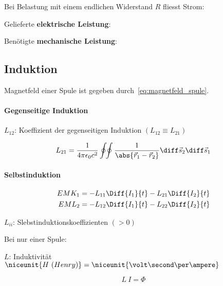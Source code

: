 		Bei Belastung mit einem endlichen Widerstand $R$ fliesst Strom:
		
		Gelieferte \textbf{elektrische Leistung}:
		
		Benötigte \textbf{mechanische Leistung}:
	\subsection{Induktion} %
		Magnetfeld einer Spule ist gegeben durch~\eqref{eq:magnetfeld_spule}.
		
		\paragraph{Gegenseitige Induktion} %
			\begin{tightitemize}
				\item[$L_{12}$:] Koeffizient der gegenseitigen Induktion $(L_{12} \equiv L_{21})$
			\end{tightitemize}
			\begin{equation*}
				L_{21} = \frac{1}{4\pi\epsilon_0 c^2} \oint\!\!\oint \frac{1}{\abs{\vec r_1 - \vec r_2}} \diff \vec s_2 \diff \vec s_1
			\end{equation*}
		
		\paragraph{Selbstinduktion} %
			\begin{align*}
				EMK_1 &= -L_{11} \Diff{I_1}{t} - L_{21}\Diff{I_2}{t} \\
				EML_2 &= -L_{12} \Diff{I_1}{t} - L_{22}\Diff{I_2}{t}
			\end{align*}
			\begin{tightitemize}
				\item[$L_{ii}$:] Slebstinduktionskoeffizienten $(> 0)$
			\end{tightitemize}
			
			Bei nur einer Spule:
			\begin{tightitemize}
				\item[$L$:] Induktivität $\niceunit{H\ (Henry)}
				= \niceunit{\volt\second\per\ampere}$
			\end{tightitemize}
			\begin{equation*}
				L\:I =\Phi
			\end{equation*}
